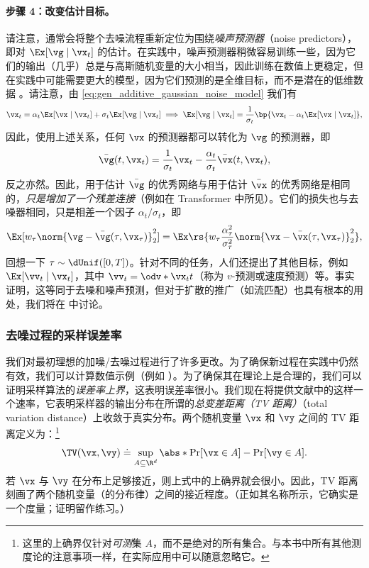 \documentclass[../../book-main_zh.tex]{subfiles}
\begin{document}
\paragraph{步骤 4：改变估计目标。} 请注意，通常会将整个去噪流程重新定位为围绕\textit{噪声预测器}（noise predictors），即对 \(\Ex[\vg \mid
\vx_{t}]\) 的估计。在实践中，噪声预测器稍微容易训练一些，因为它们的输出（几乎）总是与高斯随机变量的大小相当，因此训练在数值上更稳定，但在实践中可能需要更大的模型，因为它们预测的是全维目标，而不是潜在的低维数据 \citep{li2025back}。请注意，由 \eqref{eq:gen_additive_gaussian_noise_model} 我们有
\begin{equation}
    \vx_{t} = \alpha_{t}\Ex[\vx \mid \vx_{t}] + \sigma_{t}\Ex[\vg
    \mid \vx_{t}] \implies \Ex[\vg \mid \vx_{t}] =
    \frac{1}{\sigma_{t}}\bp{\vx_{t} - \alpha_{t}\Ex[\vx \mid \vx_{t}]},
\end{equation}
因此，使用上述关系，任何 \(\vx\) 的预测器都可以转化为 \(\vg\) 的预测器，即
\begin{equation}
    \bar{\vg}(t, \vx_{t}) = \frac{1}{\sigma_{t}}\vx_{t} -
    \frac{\alpha_{t}}{\sigma_{t}}\bar{\vx}(t, \vx_{t}),
\end{equation}
反之亦然。因此，用于估计 \(\bar{\vg}\) 的优秀网络与用于估计 \(\bar{\vx}\) 的优秀网络是相同的，\textit{只是增加了一个残差连接}（例如在 Transformer 中所见）。它们的损失也与去噪器相同，只是相差一个因子 \(\alpha_{t}/\sigma_{t}\)，即
\begin{equation}
    \Ex[w_{\tau}\norm{\vg - \bar{\vg}(\tau,
    \vx_{\tau})}_{2}^{2}] =
    \Ex\rs{w_{\tau}\frac{\alpha_{\tau}^{2}}{\sigma_{\tau}^{2}}\norm{\vx
    - \bar{\vx}(\tau, \vx_{\tau})}_{2}^{2}},
\end{equation}
回想一下 \(\tau \sim \dUnif([0, T])\)。针对不同的任务，人们还提出了其他目标，例如 \(\Ex[\vv_{t} \mid
\vx_{t}]\)，其中 \(\vv_{t} = \odv*{\vx_{t}}{t}\)（称为 \(v\)-预测或速度预测）等。事实证明，这等同于去噪和噪声预测，但对于扩散的推广（如流匹配）也具有根本的用处，我们将在  中讨论。

\subsubsection{去噪过程的采样误差率}
我们对最初理想的加噪/去噪过程进行了许多更改。为了确保新过程在实践中仍然有效，我们可以计算数值示例（例如 ）。为了确保其在理论上是合理的，我们可以证明采样算法的\textit{误差率上界}，这表明误差率很小。我们现在将提供文献中的这样一个速率，它表明采样器的输出分布在所谓的\textit{总变差距离（TV 距离）}（total variation distance）上收敛于真实分布。两个随机变量 \(\vx\) 和 \(\vy\) 之间的 TV 距离定义为：\footnote{这里的上确界仅针对\textit{可测}集 \(A\)，而不是绝对的所有集合。与本书中所有其他测度论的注意事项一样，在实际应用中可以随意忽略它。}
\begin{equation}
    \TV(\vx, \vy) \doteq \sup_{A \subseteq \R^{d}}\abs*{\Pr[\vx \in
    A] - \Pr[\vy \in A]}.
\end{equation}
若 \(\vx\) 与 \(\vy\) 在分布上足够接近，则上式中的上确界就会很小。因此，TV 距离刻画了两个随机变量（的分布律）之间的接近程度。（正如其名称所示，它确实是一个度量；证明留作练习。）
\end{document}
